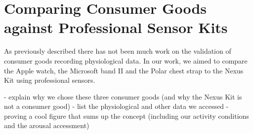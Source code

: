 \section{Comparing Consumer Goods against Professional Sensor Kits}

As previously described there has not been much work on the validation of consumer goods recording physiological data. 
In our work, we aimed to compare the Apple watch, the Microsoft band II and the Polar chest strap to the Nexus Kit using professional sensors. 

- explain why we chose these three consumer goods (and why the Nexus Kit is not a consumer good) 
- list the physiological and other data we accessed 
- proving a cool figure that sums up the concept (including our activity conditions and the arousal accessment)


 


